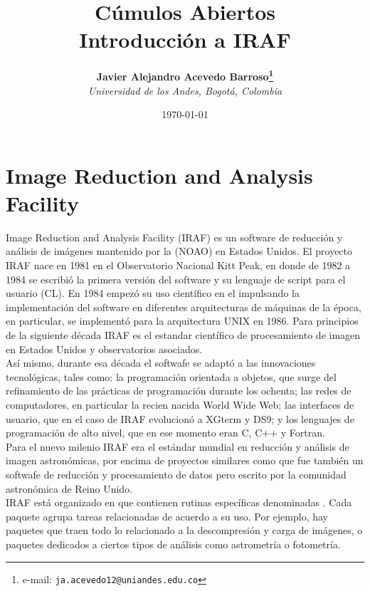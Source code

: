 \documentclass[12pt]{article}
\begin{document}
\title{Cúmulos Abiertos \\ Introducción a IRAF}

\author{
\textbf{Javier Alejandro Acevedo Barroso\thanks{e-mail: \texttt{ja.acevedo12@uniandes.edu.co}}}\\
\textit{Universidad de los Andes, Bogotá, Colombia}\\
 }%
 
\date{\today}
\maketitle %

\normalsize
\newpage


\section{Image Reduction and Analysis Facility}
Image Reduction and Analysis Facility (IRAF) es un software de reducción y análisis de imágenes mantenido por la  (NOAO) en Estados Unidos. El proyecto IRAF nace en 1981 en el Observatorio Nacional Kitt Peak, en donde de 1982 a 1984 se escribió la primera versión del software y su lenguaje de script para el usuario  (CL). En 1984 empezó su uso científico en el  impulsando la implementación del software en diferentes arquitecturas de máquinas de la época, en particular, se implementó para la arquitectura UNIX en 1986. Para principios de la siguiente década IRAF es el estandar científico de procesamiento de imagen en Estados Unidos y observatorios asociados\cite{IRAFinThe80}. \\
Así mismo, durante esa década el softwafe se adaptó a las innovaciones tecnológicas, tales como: la programación orientada a objetos, que surge del refinamiento de las prácticas de programación durante los ochenta; las redes de computadores, en particular la recien nacida World Wide Web; las interfaces de usuario, que en el caso de IRAF evolucionó a XGterm y DS9; y los lenguajes de programación de alto nivel, que en ese momento eran C, C++ y Fortran\cite{IRAFinThe90}.\\
Para el nuevo milenio IRAF era el estándar mundial en reducción y análisis de imagen astronómicas, por encima de proyectos similares como  que fue también un softwafe de reducción y procesamiento de datos pero escrito por la comunidad astronómica de Reino Unido.\\
IRAF está organizado en  que contienen rutinas específicas denominadas . Cada paquete agrupa tareas relacionadas de acuerdo a su uso. Por ejemplo, hay paquetes que traen todo lo relacionado a la descompresión y carga de imágenes, o paquetes dedicados a ciertos tipos de análisis como astrometría o fotometría.
\end{document}
